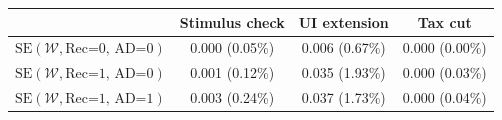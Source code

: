 \begin{tabular}{@{}lccc@{}}
\toprule
                          & Stimulus check      & UI extension    & Tax cut    \\  \midrule
$\mathrm{SE}(\mathcal{W}, \text{Rec=0, AD=0})$ & 0.000 (0.05\%)  & 0.006 (0.67\%)  & 0.000 (0.00\%)     \\
$\mathrm{SE}(\mathcal{W}, \text{Rec=1, AD=0})$ & 0.001 (0.12\%)  & 0.035 (1.93\%)  & 0.000 (0.03\%)     \\
$\mathrm{SE}(\mathcal{W}, \text{Rec=1, AD=1})$ & 0.003 (0.24\%)  & 0.037 (1.73\%)  & 0.000 (0.04\%)     \\ \bottomrule
\end{tabular}
